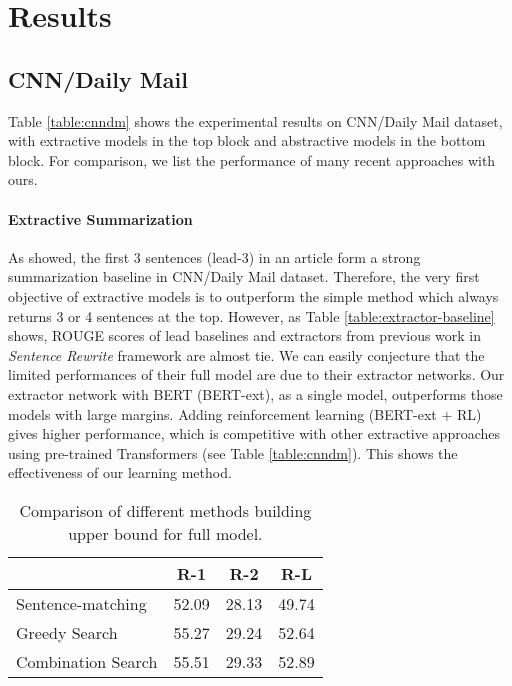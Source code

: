 \documentclass[11pt,a4paper]{article}
\begin{document}
\section{Results}

\subsection{CNN/Daily Mail}

Table \ref{table:cnndm} shows the experimental results on
CNN/Daily Mail dataset, with extractive models in the top
block and abstractive models in the bottom block. For comparison,
we list the performance of many recent approaches with ours.

\paragraph{Extractive Summarization}
As \citet{see-etal-2017-get} showed, the first 3 sentences (lead-3)
in an article form a strong summarization baseline in CNN/Daily Mail dataset.
Therefore, the very first objective of extractive models is to outperform
the simple method which always returns 3 or 4 sentences at the top.
However, as Table \ref{table:extractor-baseline} shows,
ROUGE scores of lead baselines and extractors from previous work in
\emph{Sentence Rewrite} framework \cite{chen-bansal-2018-fast, xu2019neural}
are almost tie. We can easily conjecture that the limited performances of
their full model are due to their extractor networks.
Our extractor network with BERT (BERT-ext), as a single model,
outperforms those models with large margins.
Adding reinforcement learning (BERT-ext + RL) gives higher performance,
which is competitive with other
extractive approaches using pre-trained
Transformers (see Table \ref{table:cnndm}).
This shows the effectiveness of our learning method.

\begin{table}
\begin{center}
\begin{adjustbox}{max width=0.8\columnwidth}
\begin{tabular}{l|ccc}
    \hline
    & \bf R-1 & \bf R-2 & \bf R-L \\
    \hline
    Sentence-matching & 52.09 & 28.13 & 49.74 \\
    Greedy Search & 55.27 & 29.24 & 52.64 \\
    Combination Search & 55.51 & 29.33 & 52.89 \\
    \hline
\end{tabular}
\end{adjustbox}
\end{center}
\caption{\label{table:oracle} Comparison of different methods building upper bound
for full model.}
\end{table}
\end{document}
